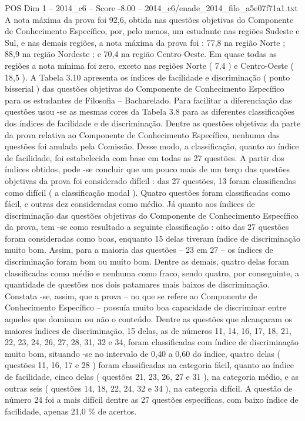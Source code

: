 \begin{textsample}{POS Dim 1 – 2014\_c6 – Score -8.00 – 2014\_c6/enade\_2014\_filo\_a5e07f71a1.txt}
A nota máxima da prova foi 92,6, obtida nas questões objetivas do Componente de Conhecimento Específico, por, pelo menos, um estudante nas regiões Sudeste e Sul, e nas demais regiões, a nota máxima da prova foi : 77,8 na região Norte ; 88,9 na região Nordeste ; e 70,4 na região Centro-Oeste.
Em quase todas as regiões a nota mínima foi zero, exceto nas regiões Norte ( 7,4 ) e Centro-Oeste ( 18,5 ).
A Tabela 3.10 apresenta os índices de facilidade e discriminação ( ponto bisserial ) das questões objetivas do Componente de Conhecimento Específico para os estudantes de Filosofia – Bacharelado.
Para facilitar a diferenciação das questões usou -se as mesmas cores da Tabela 3.8 para as diferentes classificações dos índices de facilidade e de discriminação.
Dentre as questões objetivas da parte da prova relativa ao Componente de Conhecimento Específico, nenhuma das questões foi anulada pela Comissão.
Desse modo, a classificação, quanto ao índice de facilidade, foi estabelecida com base em todas as 27 questões.
A partir dos índices obtidos, pode -se concluir que um pouco mais de um terço das questões objetivas da prova foi considerado difícil : das 27 questões, 13 foram classificadas como difícil ( a classificação modal ).
Quatro questões foram classificadas como fácil, e outras dez consideradas como médio.
Já quanto aos índices de discriminação das questões objetivas do Componente de Conhecimento Específico da prova, tem -se como resultado a seguinte classificação : oito das 27 questões foram consideradas como boas, enquanto 15 delas tiveram índice de discriminação muito bom.
Assim, para a maioria das questões – 23 em 27 – os índices de discriminação foram bom ou muito bom.
Dentre as demais, quatro delas foram classificadas como médio e nenhuma como fraco, sendo quatro, por conseguinte, a quantidade de questões nos dois patamares mais baixos de discriminação.
Constata -se, assim, que a prova – no que se refere ao Componente de Conhecimento Específico – possuía muito boa capacidade de discriminar entre aqueles que dominam ou não o conteúdo.
Dentre as questões que alcançaram os maiores índices de discriminação, 15 delas, as de números 11, 14, 16, 17, 18, 21, 22, 23, 24, 26, 27, 28, 31, 32 e 34, foram classificadas com índice de discriminação muito bom, situando -se no intervalo de 0,40 a 0,60 do índice, quatro delas ( questões 11, 16, 17 e 28 ) foram classificadas na categoria fácil, quanto ao índice de facilidade, cinco delas ( questões 21, 23, 26, 27 e 31 ), na categoria médio, e as outras seis ( questões 14, 18, 22, 24, 32 e 34 ), na categoria difícil.
A questão de número 24 foi a mais difícil dentre as 27 questões específicas, com baixo índice de facilidade, apenas 21,0 \% de acertos.

\end{textsample}
